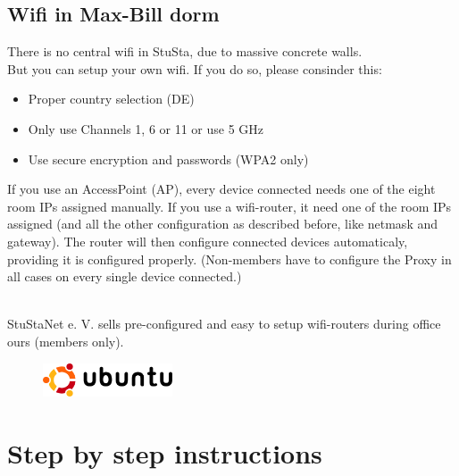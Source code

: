 \documentclass[a4paper,12pt]{scrartcl}
\begin{document}
\newpage
\subsection*{Wifi in Max-Bill dorm}
There is no central wifi in StuSta, due to massive concrete walls.
\\
But you can setup your own wifi. If you do so, please consinder this:
\begin{itemize}
    \item Proper country selection (DE)
    \item Only use Channels 1, 6 or 11 or use 5 GHz
    \item Use secure encryption and passwords (WPA2 only)
\end{itemize}
If you use an AccessPoint (AP), every device connected needs one of the eight room IPs assigned manually. If you use a wifi-router, it need one of the room IPs assigned (and all the other configuration as described before, like netmask and gateway). The router will then configure connected devices automaticaly, providing it is configured properly. (Non-members have to configure the Proxy in all cases on every single device connected.)

\vspace{2em}
\
\\
StuStaNet e. V. sells pre-configured and easy to setup wifi-routers during office ours (members only).

\newpage

\begin{figure}[t!]
    \raggedleft
    \vspace{-20pt}
    \includegraphics[height=1cm,keepaspectratio]{Bilder/Ubuntu_logo}
    \vspace{-30pt}
\end{figure}

\section*{Step by step instructions}
\end{document}

